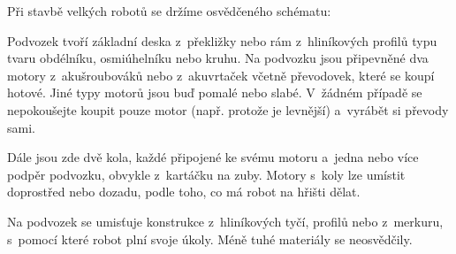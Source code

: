  Při stavbě velkých robotů se držíme osvědčeného schématu: 

  Podvozek tvoří základní deska z~překližky nebo rám z~hliníkových profilů typu  tvaru obdélníku, osmiúhelníku nebo kruhu. 
   Na podvozku jsou  připevněné dva motory z~akušroubováků nebo z~akuvrtaček včetně převodovek, které se koupí hotové. 
   Jiné typy motorů jsou buď pomalé nebo slabé. 
   V~žádném případě se nepokoušejte koupit pouze motor (např. protože je levnější) a~vyrábět si převody sami.  
 
 Dále jsou zde dvě kola, každé připojené ke svému motoru a~jedna nebo více podpěr podvozku, 
 obvykle z~kartáčku na zuby.
  Motory s~koly lze umístit doprostřed nebo dozadu, podle toho, co má robot na hřišti dělat. 
 
 Na podvozek se umisťuje konstrukce z~hliníkových tyčí, profilů nebo z~merkuru, s~pomocí které robot plní svoje úkoly. 
 Méně tuhé materiály se neosvědčily.    
 

  
